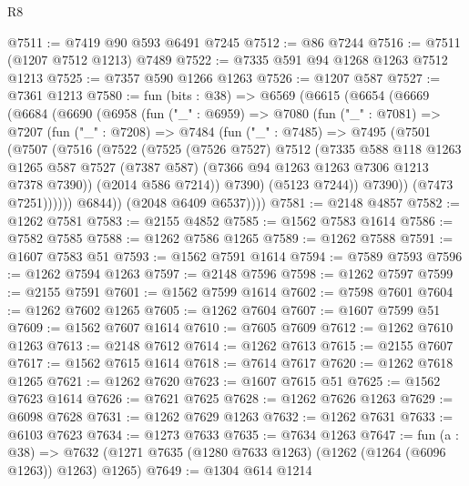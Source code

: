 \begin{lexlean}{R8}
\begin{coremodule}
@7511 := @7419 @90 @593 @6491 @7245
@7512 := @86 @7244
@7516 := @7511 (@1207 @7512 @1213) @7489
@7522 := @7335 @591 @94 @1268 @1263 @7512 @1213
@7525 := @7357 @590 @1266 @1263
@7526 := @1207 @587
@7527 := @7361 @1213
@7580 := fun (bits : @38) =>
  @6569
    (@6615
      (@6654
        (@6669
          (@6684
            (@6690
              (@6958
                (fun ("_" : @6959) =>
                @7080
                  (fun ("_" : @7081) =>
                  @7207
                    (fun ("_" : @7208) =>
                    @7484
                      (fun ("_" : @7485) =>
                      @7495
                        (@7501
                          (@7507
                            (@7516
                              (@7522
                                (@7525
                                  (@7526 @7527)
                                  @7512
                                  (@7335
                                    @588
                                    @118
                                    @1263
                                    @1265
                                    @587
                                    @7527
                                    (@7387 @587)
                                    (@7366 @94 @1263 @1263 @7306 @1213 @7378 @7390))
                                  (@2014 @586 @7214))
                                @7390)
                              (@5123 @7244))
                            @7390))
                        (@7473 @7251))))))
              @6844))
          (@2048 @6409 @6537))))
@7581 := @2148 @4857
@7582 := @1262 @7581
@7583 := @2155 @4852
@7585 := @1562 @7583 @1614
@7586 := @7582 @7585
@7588 := @1262 @7586 @1265
@7589 := @1262 @7588
@7591 := @1607 @7583 @51
@7593 := @1562 @7591 @1614
@7594 := @7589 @7593
@7596 := @1262 @7594 @1263
@7597 := @2148 @7596
@7598 := @1262 @7597
@7599 := @2155 @7591
@7601 := @1562 @7599 @1614
@7602 := @7598 @7601
@7604 := @1262 @7602 @1265
@7605 := @1262 @7604
@7607 := @1607 @7599 @51
@7609 := @1562 @7607 @1614
@7610 := @7605 @7609
@7612 := @1262 @7610 @1263
@7613 := @2148 @7612
@7614 := @1262 @7613
@7615 := @2155 @7607
@7617 := @1562 @7615 @1614
@7618 := @7614 @7617
@7620 := @1262 @7618 @1265
@7621 := @1262 @7620
@7623 := @1607 @7615 @51
@7625 := @1562 @7623 @1614
@7626 := @7621 @7625
@7628 := @1262 @7626 @1263
@7629 := @6098 @7628
@7631 := @1262 @7629 @1263
@7632 := @1262 @7631
@7633 := @6103 @7623
@7634 := @1273 @7633
@7635 := @7634 @1263
@7647 := fun (a : @38) =>
  @7632 (@1271 @7635 (@1280 @7633 @1263) (@1262 (@1264 (@6096 @1263)) @1263) @1265)
@7649 := @1304 @614 @1214

\end{coremodule}
\end{lexlean}
